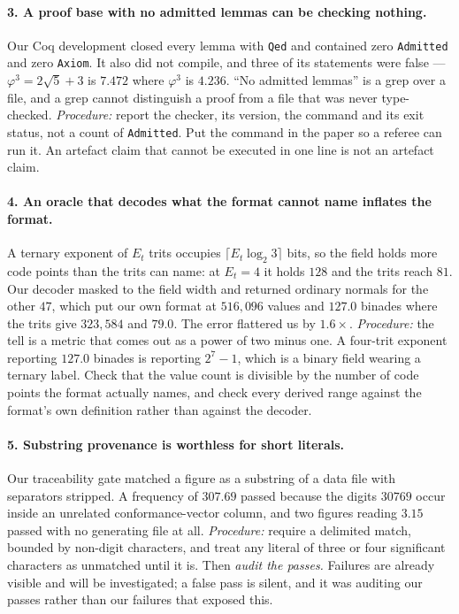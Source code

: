 \documentclass[11pt]{article}
\theoremstyle{definition}
\begin{document}
\paragraph{3. A proof base with no admitted lemmas can be checking nothing.} Our
Coq development closed every lemma with \texttt{Qed} and contained zero
\texttt{Admitted} and zero \texttt{Axiom}. It also did not compile, and three of
its statements were false --- $\varphi^3=2\sqrt5+3$ is $7.472$ where $\varphi^3$
is $4.236$. ``No admitted lemmas'' is a grep over a file, and a grep cannot
distinguish a proof from a file that was never type-checked.
\emph{Procedure:} report the checker, its version, the command and its exit
status, not a count of \texttt{Admitted}. Put the command in the paper so a
referee can run it. An artefact claim that cannot be executed in one line is not
an artefact claim.

\paragraph{4. An oracle that decodes what the format cannot name inflates the
format.} A ternary exponent of $E_t$ trits occupies
$\lceil E_t\log_2 3\rceil$ bits, so the field holds more code points than the
trits can name: at $E_t=4$ it holds $128$ and the trits reach $81$. Our decoder
masked to the field width and returned ordinary normals for the other $47$, which
put our own format at $516{,}096$ values and $127.0$ binades where the trits give
$323{,}584$ and $79.0$. The error flattered us by $1.6\times$.
\emph{Procedure:} the tell is a metric that comes out as a power of two minus one.
A four-trit exponent reporting $127.0$ binades is reporting $2^7-1$, which is a
binary field wearing a ternary label. Check that the value count is divisible by
the number of code points the format actually names, and check every derived
range against the format's own definition rather than against the decoder.

\paragraph{5. Substring provenance is worthless for short literals.} Our
traceability gate matched a figure as a substring of a data file with separators
stripped. A frequency of $307.69$ passed because the digits $30769$ occur inside
an unrelated conformance-vector column, and two figures reading $3.15$ passed
with no generating file at all.
\emph{Procedure:} require a delimited match, bounded by non-digit characters, and
treat any literal of three or four significant characters as unmatched until it
is. Then \emph{audit the passes.} Failures are already visible and will be
investigated; a false pass is silent, and it was auditing our passes rather than
our failures that exposed this.
\end{document}
